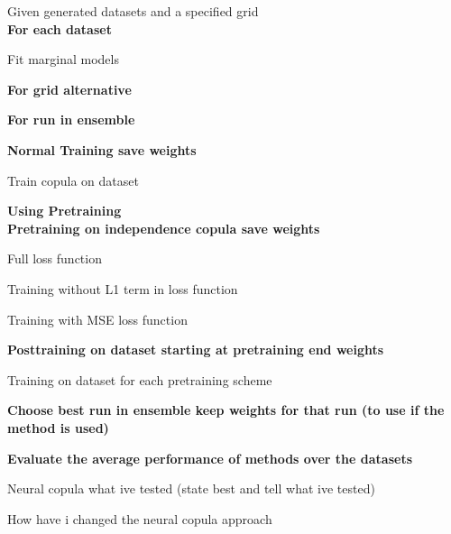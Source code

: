 \begin{generalinstructions}
Given generated datasets and a specified grid\\
\textbf{For each dataset}
\begin{compactitem}
    \item Fit marginal models
    \item \textbf{For grid alternative}
    \begin{compactitem}
        \item \textbf{For run in ensemble}
        \begin{compactitem}
            \item \textbf{Normal Training save weights} 
            \begin{compactitem}
                \item Train copula on dataset
            \end{compactitem}
            \item \textbf{Using Pretraining}\\
            \textbf{Pretraining on independence copula save weights}
            \begin{compactitem}             
                \item Full loss function
                \item Training without L1 term in loss function
                \item Training with MSE loss function
            \end{compactitem}
            \textbf{Posttraining on dataset starting at pretraining end weights}
            \begin{compactitem}             
                \item Training on dataset for each pretraining scheme
            \end{compactitem}
        \end{compactitem}
        \item \textbf{Choose best run in ensemble keep weights for that run (to use if the method is used)}
    \end{compactitem}
\end{compactitem}
\textbf{Evaluate the average performance of methods over the datasets}
\end{generalinstructions}



Neural copula what ive tested (state best and tell what ive tested)

How have i changed the neural copula approach 


